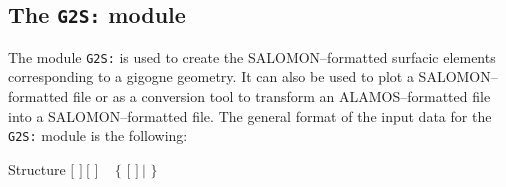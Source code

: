 \subsection{The {\tt G2S:} module}\label{sect:G2SData}

The module {\tt G2S:} is used to create the SALOMON--formatted surfacic elements corresponding
to a gigogne geometry. It can also be used to plot a SALOMON--formatted file or as a conversion tool to transform an ALAMOS--formatted file into
a SALOMON--formatted file. The general format of the input data for the {\tt G2S:} module is the following:
\begin{DataStructure}{Structure }
$[$  $]~[$  $]$ \moc{:=} ~ $\{$  $[$  $]~|$  $\}$ ~\moc{::}~ \\
\end{DataStructure}

